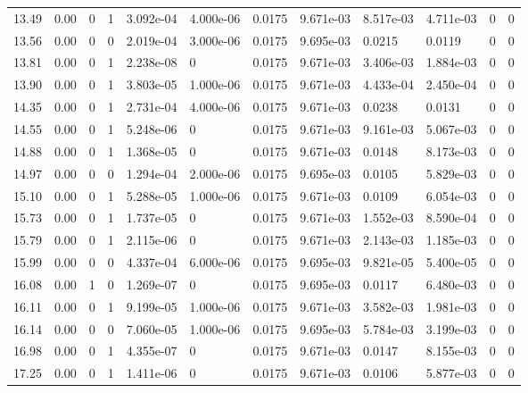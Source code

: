 \documentclass[preview]{standalone}
\begin{document}
{{{\begin{tabular}{L{1.2cm}C{1.2cm} C{0.3cm}C{0.5cm} C{1.4cm}C{1.4cm} C{1.4cm}C{1.4cm} C{1.6cm}C{1.6cm} C{1.6cm}C{1.6cm}}
  13.49  &  0.00  & 0     &  1 &  3.092e-04  & 4.000e-06  &  0.0175&   9.671e-03& 8.517e-03 & 4.711e-03   &  0 & 0  \\ 
  13.56  &  0.00  & 0     &  0 &  2.019e-04  & 3.000e-06  &  0.0175&   9.695e-03& 0.0215 & 0.0119   &  0 & 0  \\ 
  13.81  &  0.00  & 0     &  1 &  2.238e-08  & 0  &  0.0175&   9.671e-03& 3.406e-03 & 1.884e-03   &  0 & 0  \\ 
  13.90  &  0.00  & 0     &  1 &  3.803e-05  & 1.000e-06  &  0.0175&   9.671e-03& 4.433e-04 & 2.450e-04   &  0 & 0  \\ 
  14.35  &  0.00  & 0     &  1 &  2.731e-04  & 4.000e-06  &  0.0175&   9.671e-03& 0.0238 & 0.0131   &  0 & 0  \\ 
  14.55  &  0.00  & 0     &  1 &  5.248e-06  & 0  &  0.0175&   9.671e-03& 9.161e-03 & 5.067e-03   &  0 & 0  \\ 
  14.88  &  0.00  & 0     &  1 &  1.368e-05  & 0  &  0.0175&   9.671e-03& 0.0148 & 8.173e-03   &  0 & 0  \\ 
  14.97  &  0.00  & 0     &  0 &  1.294e-04  & 2.000e-06  &  0.0175&   9.695e-03& 0.0105 & 5.829e-03   &  0 & 0  \\ 
  15.10  &  0.00  & 0     &  1 &  5.288e-05  & 1.000e-06  &  0.0175&   9.671e-03& 0.0109 & 6.054e-03   &  0 & 0  \\ 
  15.73  &  0.00  & 0     &  1 &  1.737e-05  & 0  &  0.0175&   9.671e-03& 1.552e-03 & 8.590e-04   &  0 & 0  \\ 
  15.79  &  0.00  & 0     &  1 &  2.115e-06  & 0  &  0.0175&   9.671e-03& 2.143e-03 & 1.185e-03   &  0 & 0  \\ 
  15.99  &  0.00  & 0     &  0 &  4.337e-04  & 6.000e-06  &  0.0175&   9.695e-03& 9.821e-05 & 5.400e-05   &  0 & 0  \\ 
  16.08  &  0.00  & 1     &  0 &  1.269e-07  & 0  &  0.0175&   9.695e-03& 0.0117 & 6.480e-03   &  0 & 0  \\ 
  16.11  &  0.00  & 0     &  1 &  9.199e-05  & 1.000e-06  &  0.0175&   9.671e-03& 3.582e-03 & 1.981e-03   &  0 & 0  \\ 
  16.14  &  0.00  & 0     &  0 &  7.060e-05  & 1.000e-06  &  0.0175&   9.695e-03& 5.784e-03 & 3.199e-03   &  0 & 0  \\ 
  16.98  &  0.00  & 0     &  1 &  4.355e-07  & 0  &  0.0175&   9.671e-03& 0.0147 & 8.155e-03   &  0 & 0  \\ 
  17.25  &  0.00  & 0     &  1 &  1.411e-06  & 0  &  0.0175&   9.671e-03& 0.0106 & 5.877e-03   &  0 & 0  \\ 

\end{tabular}}}}
\end{document}
